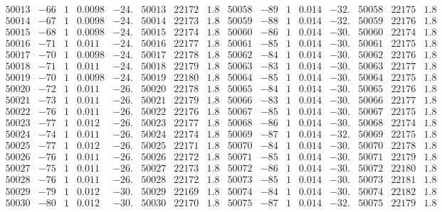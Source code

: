 \documentclass[11pt,reqno,a4letter]{article}
\numberwithin{figure}{section}
\numberwithin{table}{section}
\theoremstyle{plain}
\numberwithin{theorem}{section}
\theoremstyle{definition}
\begin{document}
\begin{table}[ht!]
\begin{equation*}
{\begin{array}{ccccc|ccc||ccccc|ccc}
50013 & -66 & 1 & 0.0098 & -24. & 50013 & 22172 & 1.8 & 50058 & -89 & 1 & 0.014 & -32. & 50058 & 22175 & 1.8  \\
50014 & -67 & 1 & 0.0098 & -24. & 50014 & 22173 & 1.8 & 50059 & -88 & 1 & 0.014 & -32. & 50059 & 22176 & 1.8  \\
50015 & -68 & 1 & 0.0098 & -24. & 50015 & 22174 & 1.8 & 50060 & -86 & 1 & 0.014 & -30. & 50060 & 22174 & 1.8  \\
50016 & -71 & 1 & 0.011 & -24. & 50016 & 22177 & 1.8 & 50061 & -85 & 1 & 0.014 & -30. & 50061 & 22175 & 1.8  \\
50017 & -70 & 1 & 0.0098 & -24. & 50017 & 22178 & 1.8 & 50062 & -84 & 1 & 0.014 & -30. & 50062 & 22176 & 1.8  \\
50018 & -71 & 1 & 0.011 & -24. & 50018 & 22179 & 1.8 & 50063 & -83 & 1 & 0.014 & -30. & 50063 & 22177 & 1.8  \\
50019 & -70 & 1 & 0.0098 & -24. & 50019 & 22180 & 1.8 & 50064 & -85 & 1 & 0.014 & -30. & 50064 & 22175 & 1.8  \\
50020 & -72 & 1 & 0.011 & -26. & 50020 & 22178 & 1.8 & 50065 & -84 & 1 & 0.014 & -30. & 50065 & 22176 & 1.8  \\
50021 & -73 & 1 & 0.011 & -26. & 50021 & 22179 & 1.8 & 50066 & -83 & 1 & 0.014 & -30. & 50066 & 22177 & 1.8  \\
50022 & -76 & 1 & 0.011 & -26. & 50022 & 22176 & 1.8 & 50067 & -85 & 1 & 0.014 & -30. & 50067 & 22175 & 1.8  \\
50023 & -77 & 1 & 0.012 & -26. & 50023 & 22177 & 1.8 & 50068 & -86 & 1 & 0.014 & -30. & 50068 & 22174 & 1.8  \\
50024 & -74 & 1 & 0.011 & -26. & 50024 & 22174 & 1.8 & 50069 & -87 & 1 & 0.014 & -32. & 50069 & 22175 & 1.8  \\
50025 & -77 & 1 & 0.012 & -26. & 50025 & 22171 & 1.8 & 50070 & -84 & 1 & 0.014 & -30. & 50070 & 22178 & 1.8  \\
50026 & -76 & 1 & 0.011 & -26. & 50026 & 22172 & 1.8 & 50071 & -85 & 1 & 0.014 & -30. & 50071 & 22179 & 1.8  \\
50027 & -75 & 1 & 0.011 & -26. & 50027 & 22173 & 1.8 & 50072 & -86 & 1 & 0.014 & -30. & 50072 & 22180 & 1.8  \\
50028 & -76 & 1 & 0.011 & -26. & 50028 & 22172 & 1.8 & 50073 & -85 & 1 & 0.014 & -30. & 50073 & 22181 & 1.8  \\
50029 & -79 & 1 & 0.012 & -30. & 50029 & 22169 & 1.8 & 50074 & -84 & 1 & 0.014 & -30. & 50074 & 22182 & 1.8  \\
50030 & -80 & 1 & 0.012 & -30. & 50030 & 22170 & 1.8 & 50075 & -87 & 1 & 0.014 & -32. & 50075 & 22179 & 1.8  \\

\end{array}}
\end{equation*}
\end{table}
\end{document}
